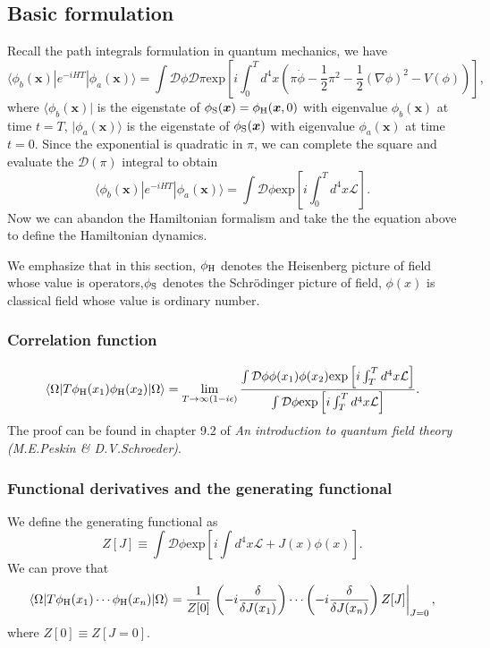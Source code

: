 \subsection{Basic formulation}
\noindent
Recall the path integrals formulation in quantum mechanics, we have
\[\langle \phi_b(\bm{x}) | e^{-iHT} | \phi_a(\bm{x}) \rangle = \int \mathcal{D}\phi \mathcal{D}\pi  \mathrm{exp} \left[ i\int_0^T d^4x (\pi\dot{\phi} - \frac{1}{2}\pi^2 - \frac{1}{2}(\nabla \phi)^2 -V(\phi))\right],\]
where $\langle \phi_b(\bm{x}) |$ is the eigenstate of $\phi_{\rm S}(\bm{x})=\phi_{\rm H}(\bm{x},0)$ with eigenvalue $\phi_b(\bm{x})$ at time $t=T$, $| \phi_a(\bm{x}) \rangle$ is the eigenstate of $\phi_{\rm S}(\bm{x})$ with eigenvalue $\phi_a(\bm{x})$ at time $t=0$.
Since the exponential is quadratic in $\pi$, we can complete the square and evaluate the $\mathcal{D}(\pi)$ integral to obtain
\[\langle \phi_b(\bm{x}) | e^{-iHT} | \phi_a(\bm{x}) \rangle = \int \mathcal{D}\phi  \mathrm{exp} \left[ i\int_0^T d^4x \mathcal{L} \right].\]
Now we can abandon the Hamiltonian formalism and take the the equation above to define the Hamiltonian dynamics.
\begin{note}
We emphasize that in this section, $\phi_{\rm H}$ denotes the Heisenberg picture of field whose value is operators,$\phi_{\rm S}$ denotes the Schr\"{o}dinger picture of field, $\phi(x)$ is classical field whose value is ordinary number.
\end{note}

\subsubsection{Correlation function}
\[\langle \Omega | T \phi_{\rm H}(x_1) \phi_{\rm H}(x_2)| \Omega \rangle = \lim_{T \to \infty(1-i\epsilon)} \frac{\int \mathcal{D}\phi \phi(x_1)\phi(x_2) \mathrm{exp} \left[ i\int_T^T d^4x \mathcal{L} \right]}{\int \mathcal{D} \phi \mathrm{exp} \left[ i\int_T^T d^4x \mathcal{L} \right]}.\]
The proof can be found in chapter 9.2 of \emph{An introduction to quantum field theory (M.E.Peskin \& D.V.Schroeder)}.

\subsubsection{Functional derivatives and the generating functional}
\noindent
We define the generating functional as
\[Z[J] \equiv \int \mathcal{D} \phi \mathrm{exp} \left[ i\int d^4x \mathcal{L} + J(x)\phi(x) \right].\]
We can prove that
\[\langle \Omega | T \phi_{\rm H}(x_1) \cdots \phi_{\rm H}(x_n) | \Omega \rangle = \frac{1}{Z[0]} \left. \left( -i\frac{\delta}{\delta J(x_1)} \right)\cdots \left( -i\frac{\delta}{\delta J(x_n)} \right) Z[J]\right|_{J=0},\]
where $Z[0] \equiv Z[J=0]$.

